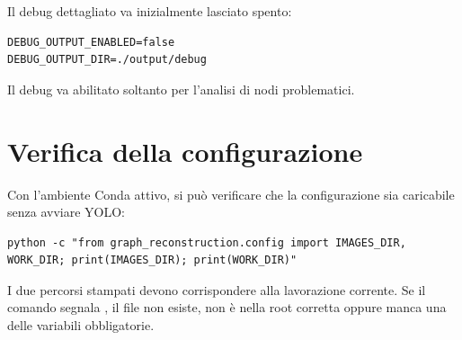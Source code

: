 Il debug dettagliato va inizialmente lasciato spento:

\begin{lstlisting}[language={}]
DEBUG_OUTPUT_ENABLED=false
DEBUG_OUTPUT_DIR=./output/debug
\end{lstlisting}

Il debug va abilitato soltanto per l'analisi di nodi problematici.

\section{Verifica della configurazione}

Con l'ambiente Conda attivo, si può verificare che la configurazione sia
caricabile senza avviare YOLO:

\begin{lstlisting}[language={}]
python -c "from graph_reconstruction.config import IMAGES_DIR, WORK_DIR; print(IMAGES_DIR); print(WORK_DIR)"
\end{lstlisting}

I due percorsi stampati devono corrispondere alla lavorazione corrente. Se il
comando segnala , il file 
non esiste, non è nella root corretta oppure manca una delle variabili
obbligatorie.
